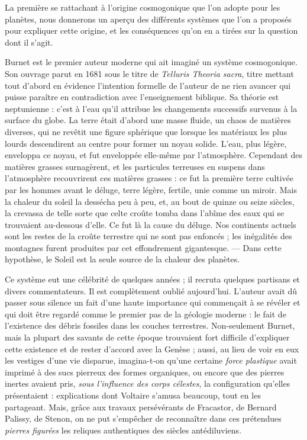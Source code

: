 \documentclass[a4paper, 11pt, oneside]{article}
\begin{document}
La première se rattachant à l'origine cosmogonique que l'on adopte pour les planètes, nous donnerons un aperçu des différents systèmes que l'on a proposés pour expliquer cette origine, et les conséquences qu'on en a tirées sur la question dont il s'agit.

Burnet est le premier auteur moderne qui ait imaginé un système cosmogonique. Son ouvrage parut en 1681 sous le titre de \emph{Telluris Theoria sacra}, titre mettant tout d'abord en évidence l'intention formelle de l'auteur de ne rien avancer qui puisse paraître en contradiction avec l'enseignement biblique. Sa théorie est neptunienne : c'est à l'eau qu'il attribue les changements successifs survenus à la surface du globe. La terre était d'abord une masse fluide, un chaos de matières diverses, qui ne revêtit une figure sphérique que lorsque les matériaux les plus lourds descendirent au centre pour former un noyau solide. L'eau, plus légère, enveloppa ce noyau, et fut enveloppée elle-même par l'atmosphère. Cependant des matières grasses surnagèrent, et les particules terreuses en suspens dans l'atmosphère recouvrirent ces matières grasses : ce fut la première terre cultivée par les hommes avant le déluge, terre légère, fertile, unie comme un miroir. Mais la chaleur du soleil la dessécha peu à peu, et, au bout de quinze ou seize siècles, la crevassa de telle sorte que celte croûte tomba dans l'abîme des eaux qui se trouvaient au-dessous d'elle. Ce fut là la cause du déluge. Nos continents actuels sont les restes de la croûte terrestre qui ne sont pas enfoncés ; les inégalités des montagnes furent produites par cet effondrement gigantesque. --- Dans cette hypothèse, le Soleil est la seule source de la chaleur des planètes.

Ce système eut une célébrité de quelques années ; il recruta quelques partisans et divers commentateurs. Il est complètement oublié aujourd'hui. L'auteur avait dû passer sous silence un fait d'une haute importance qui commençait à se révéler et qui doit être regardé comme le premier pas de la géologie moderne : le fait de l'existence des débris fossiles dans les couches terrestres. Non-seulement Burnet, mais la plupart des savants de cette époque trouvaient fort difficile d'expliquer cette existence et de rester d'accord avec la Genèse ; aussi, au lieu de voir en eux les vestiges d'une vie disparue, imagina-t-on qu'une certaine \emph{force plastique} avait imprimé à des sucs pierreux des formes organiques, ou encore que des pierres inertes avaient pris, \emph{sous l'influence des corps célestes}, la configuration qu'elles présentaient : explications dont Voltaire s'amusa beaucoup, tout en les partageant. Mais, grâce aux travaux persévérants de Fracastor, de Bernard Palissy, de Stenon, on ne put s'empêcher de reconnaître dans ces prétendues \emph{pierres figurées} les reliques authentiques des siècles antédiluviens.
\end{document}
